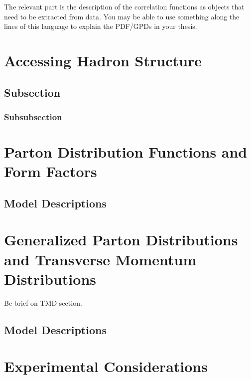 \documentclass[
]{report}
\begin{document}
The relevant part is the description of the correlation functions as
objects that need to be extracted from data. You may be able to use
something along the lines of this language to explain the PDF/GPDs in
your thesis.

\hypertarget{Section-3.2}{%
\section{Accessing Hadron Structure}\label{Section-3.2}}

\hypertarget{subsection}{%
\subsection{Subsection}\label{subsection}}

\hypertarget{subsubsection}{%
\subsubsection{Subsubsection}\label{subsubsection}}

\hypertarget{Section-3.3}{%
\section{Parton Distribution Functions and Form
Factors}\label{Section-3.3}}

\hypertarget{model-descriptions}{%
\subsection{Model Descriptions}\label{model-descriptions}}

\hypertarget{Section-3.4}{%
\section{Generalized Parton Distributions and Transverse Momentum
Distributions}\label{Section-3.4}}

Be brief on TMD section.

\hypertarget{model-descriptions-1}{%
\subsection{Model Descriptions}\label{model-descriptions-1}}

\hypertarget{Section-3.5}{%
\section{Experimental Considerations}\label{Section-3.5}}
\end{document}
